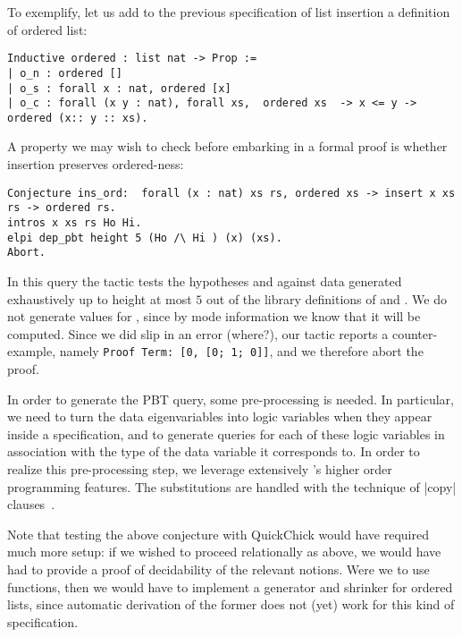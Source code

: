To exemplify, let us add to the previous specification of list
insertion a definition of ordered list:
\begin{lstlisting}
Inductive ordered : list nat -> Prop :=
| o_n : ordered []
| o_s : forall x : nat, ordered [x]
| o_c : forall (x y : nat), forall xs,  ordered xs  -> x <= y -> ordered (x:: y :: xs).     
\end{lstlisting}
%
A property we may wish to check before embarking in a formal proof is
whether insertion preserves ordered-ness:
\begin{lstlisting}
Conjecture ins_ord:  forall (x : nat) xs rs, ordered xs -> insert x xs rs -> ordered rs.
intros x xs rs Ho Hi.
elpi dep_pbt height 5 (Ho /\ Hi ) (x) (xs).
Abort.
\end{lstlisting}
In this query the tactic tests the hypotheses  and 
against data  generated exhaustively up to height
at most $5$  out of the library  definitions of
 and . We do not generate values for ,
since by mode information we know that it will be computed.
%
Since we did slip in an error (where?), our tactic reports a
counter-example, namely \verb|Proof Term: [0, [0; 1; 0]]|, and
we therefore abort the proof.


In order to generate the PBT query, some
pre-processing is needed. In particular, we need to turn the data
eigenvariables into \lP logic variables when they appear inside a
specification, and to generate queries %
for each of
these logic variables in association with the type of the data
variable it corresponds to.  In order to realize this pre-processing step,
we leverage extensively \lP's higher order programming features. The
substitutions are handled with the technique of \lsti|copy| clauses~\cite{miller91jlc}.

Note that testing the above conjecture with \textsf{QuickChick} would
have required much more setup: if we wished to proceed relationally as
above, we would have had to provide a proof of decidability of the
relevant notions. Were we to use functions, then we would have to
implement a generator and shrinker for ordered lists, since automatic
derivation of the former does not (yet) work for this kind of specification.


